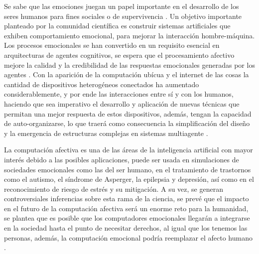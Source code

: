 %
%
%

\introduccion

Se sabe que las emociones juegan un papel importante en el desarrollo de los
seres humanos para fines sociales o de supervivencia \citep{cuevas2015, rodriguez2015}.
Un objetivo importante planteado por la comunidad científica es
construir sistemas artificiales que exhiben comportamiento emocional, para
mejorar la interacción hombre-máquina. Los procesos emocionales se han
convertido en un requisito esencial en arquitecturas de agentes cognitivos, se
espera que el procesamiento afectivo mejore la calidad y la credibilidad de las
respuestas emocionales generadas por los agentes \citep{rodriguez2015}. Con
la aparición de la computación ubícua \citep{weiser1993} y el internet de las
cosas \citep{ashton2009} la cantidad de dispositivos heterogéneos conectados ha
aumentado considerablemente, y por ende las interacciones entre sí y con los
humanos, haciendo que sea imperativo el desarrollo y aplicación de nuevas
técnicas que permitan una mejor respuesta de estos dispositivos, además,
tengan la capacidad de auto-organizarse, lo que traerá como consecuencia la
simplificación del diseño y la emergencia de estructuras complejas en sistemas
multiagente \citep{perozo2011}.

La computación afectiva es una de las áreas de la inteligencia artificial con
mayor interés debido a las posibles aplicaciones, puede ser usada en
simulaciones de sociedades emocionales como las del ser humano, en el
tratamiento de trastornos como el autismo, el síndrome de Asperger, la
epilepsia y depresión, así como en el reconocimiento de riesgo de estrés y su
mitigación. A su vez, se generan controversiales inferencias
sobre esta rama de la ciencia, se prevé que el impacto en el futuro de la
computación afectiva será un enorme reto para la humanidad, se plantea que es
posible que los computadores emocionales llegarán a integrarse en la sociedad
hasta el punto de necesitar derechos, al igual que los tenemos las personas,
además, la computación emocional podría reemplazar el afecto humano \citep{cuevas2015}.

